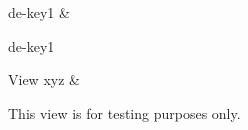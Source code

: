 \hline

de-key1
&

de-key1
\\
\hline
\hline

View xyz
&

This view is for testing purposes only.
\\
\hline
